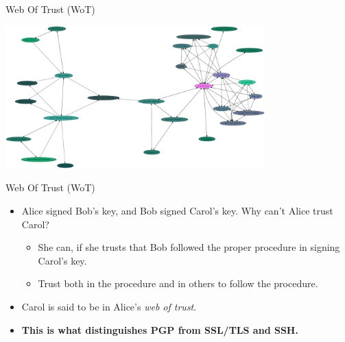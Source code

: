 \documentclass{beamer}
\begin{document}
\begin{frame}{Web Of Trust (WoT)}
  \centerline{\includegraphics[width=0.75\textwidth]{wot}}
\end{frame}

\begin{frame}{Web Of Trust (WoT)}
  \begin{itemize}
  \item Alice signed Bob's key, and Bob signed Carol's key.  Why can't
    Alice trust Carol?
    \begin{itemize}
      \item She can, if she trusts that Bob followed the proper
        procedure in signing Carol's key.
      \item Trust both in the procedure and in others to follow the
        procedure.
    \end{itemize}
  \item Carol is said to be in Alice's \textit{web of trust}.
  \item\textbf{This is what distinguishes PGP from SSL/TLS and SSH.}
  \end{itemize}
\end{frame}
\end{document}
